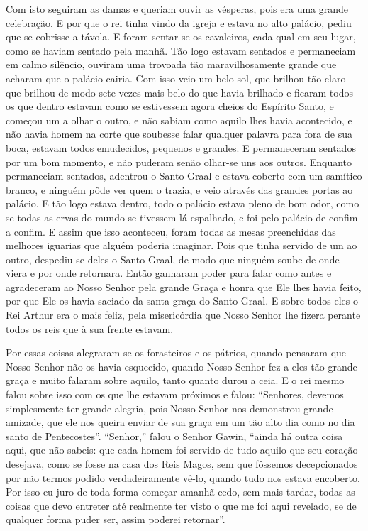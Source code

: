 Com isto seguiram as damas e queriam ouvir as vésperas, pois era uma grande
celebração. E por que o rei tinha vindo da igreja e estava no alto palácio,
pediu que se cobrisse a távola. E foram sentar-se os cavaleiros, cada qual em
seu lugar, como se haviam sentado pela manhã. Tão logo estavam sentados e
permaneciam em calmo silêncio, ouviram uma trovoada tão maravilhosamente grande
que acharam que o palácio cairia. Com isso veio um belo sol, que brilhou tão
claro que brilhou de modo sete vezes mais belo do que havia brilhado e ficaram
todos os que dentro estavam como se estivessem agora cheios do Espírito Santo,
e começou um a olhar o outro, e não sabiam como aquilo lhes havia acontecido, e
não havia homem na corte que soubesse falar qualquer palavra para fora de sua
boca, estavam todos emudecidos, pequenos e grandes. E permaneceram sentados por
um bom momento, e não puderam senão olhar-se uns aos outros. Enquanto
permaneciam sentados, adentrou o Santo Graal e estava coberto com um samítico
branco, e ninguém pôde ver quem o trazia, e veio através das grandes portas ao
palácio. E tão logo estava dentro, todo o palácio estava pleno de bom odor,
como se todas as ervas do mundo se tivessem lá espalhado, e foi pelo palácio de
confim a confim. E assim que isso aconteceu, foram todas as mesas preenchidas
das melhores iguarias que alguém poderia imaginar. Pois que tinha servido de um
ao outro, despediu-se deles o Santo Graal, de modo que ninguém soube de onde
viera e por onde retornara. Então ganharam poder para falar como antes e
agradeceram ao Nosso Senhor pela grande Graça e honra que Ele lhes havia feito,
por que Ele os havia saciado da santa graça do Santo Graal. E sobre todos eles
o Rei Arthur era o mais feliz, pela misericórdia que Nosso Senhor lhe fizera
perante todos os reis que à sua frente estavam. 

Por essas coisas alegraram-se os forasteiros e os pátrios, quando pensaram que
Nosso Senhor não os havia esquecido, quando Nosso Senhor fez a eles tão grande
graça e muito falaram sobre aquilo, tanto quanto durou a ceia. E o rei mesmo
falou sobre isso com os que lhe estavam próximos e falou: “Senhores, devemos
simplesmente ter grande alegria, pois Nosso Senhor nos demonstrou grande
amizade, que ele nos queira enviar de sua graça em um tão alto dia como no dia
santo de Pentecostes”. “Senhor,” falou o Senhor Gawin, “ainda há outra coisa
aqui, que não sabeis: que cada homem foi servido de tudo aquilo que seu coração
desejava, como se fosse na casa dos Reis Magos, sem que fôssemos decepcionados
por não termos podido verdadeiramente vê-lo, quando tudo nos estava encoberto.
Por isso eu juro de toda forma começar amanhã cedo, sem mais tardar, todas as
coisas que devo entreter até realmente ter visto o que me foi aqui revelado, se
de qualquer forma puder ser, assim poderei retornar”. 

